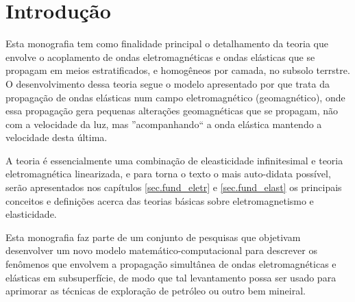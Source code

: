 \chapter{Introdução}
Esta monografia tem como finalidade principal o detalhamento da teoria que envolve o acoplamento de ondas eletromagnéticas e ondas elásticas que se propagam em meios estratificados, e homogêneos por camada, no subsolo terrstre. O desenvolvimento dessa teoria segue o modelo apresentado por \cite{erigen_1963} que trata da propagação de ondas elásticas num campo eletromagnético (geomagnético), onde essa propagação gera pequenas alterações geomagnéticas que se propagam, não com a velocidade da luz, mas ''acompanhando`` a onda elástica mantendo a velocidade desta última. 

A teoria é essencialmente uma combinação de eleasticidade infinitesimal e teoria eletromagnética linearizada, e para torna o texto o mais auto-didata possível, serão apresentados nos capítulos \ref{sec.fund_eletr} e \ref{sec.fund_elast} os principais conceitos e definições acerca das teorias básicas sobre eletromagnetismo e elasticidade. 

Esta monografia faz parte de um conjunto de pesquisas que objetivam desenvolver um novo modelo matemático-computacional para descrever os fenômenos que envolvem a propagação simultânea de ondas eletromagnéticas e elásticas em subsuperfície, de modo que tal levantamento possa ser usado para aprimorar as técnicas de exploração de petróleo ou outro bem mineiral.